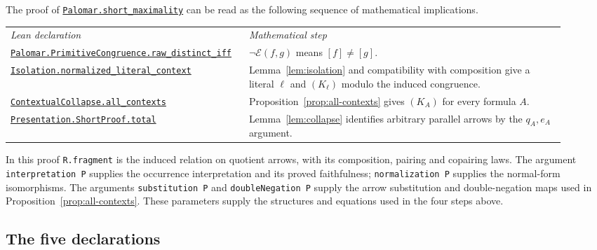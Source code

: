 \documentclass[11pt]{article}
\begin{document}
The proof of \href{https://github.com/flengyel/Dosen-Petric-Maximality/blob/5dbee39bea09539bd130f729e82636419f71f920/DosenPetric/PalomarMaximality.lean\#L27}{\texttt{Palomar.short\_maximality}} can be read as
the following sequence of mathematical implications.
\begin{center}
\small
\begin{tabular}{>{\raggedright\arraybackslash}p{0.37\linewidth}>{\raggedright\arraybackslash}p{0.55\linewidth}}
\textit{Lean declaration} & \textit{Mathematical step}\\[3pt]
\href{https://github.com/flengyel/Dosen-Petric-Maximality/blob/5dbee39bea09539bd130f729e82636419f71f920/DosenPetric/PalomarCorrespondence.lean\#L121}{\texttt{Palomar.PrimitiveCongruence.\allowbreak{}raw\_distinct\_iff}}
 & $\neg\mathcal E(f,g)$ means $[f]\ne[g]$.\\[5pt]
\href{https://github.com/flengyel/Dosen-Petric-Maximality/blob/5dbee39bea09539bd130f729e82636419f71f920/DosenPetric/Isolation.lean\#L219}{\texttt{Isolation.\allowbreak{}normalized\_literal\_context}}
 & Lemma~\ref{lem:isolation} and compatibility with composition give a literal $\ell$ and $(K_\ell)$
   modulo the induced congruence.\\[5pt]
\href{https://github.com/flengyel/Dosen-Petric-Maximality/blob/5dbee39bea09539bd130f729e82636419f71f920/DosenPetric/Substitution.lean\#L90}{\texttt{ContextualCollapse.\allowbreak{}all\_contexts}}
 & Proposition~\ref{prop:all-contexts} gives $(K_A)$ for every formula $A$.\\[5pt]
\href{https://github.com/flengyel/Dosen-Petric-Maximality/blob/5dbee39bea09539bd130f729e82636419f71f920/DosenPetric/PresentationShortProjection.lean\#L86}{\texttt{Presentation.ShortProof.\allowbreak{}total}}
 & Lemma~\ref{lem:collapse} identifies arbitrary parallel arrows by
   the $q_A,e_A$ argument.
\end{tabular}
\end{center}
In this proof \texttt{R.fragment} is the induced relation on
quotient arrows, with its composition, pairing and copairing
laws. The argument \texttt{interpretation P} supplies the
occurrence interpretation and its proved faithfulness;
\texttt{normalization P} supplies the normal-form isomorphisms.
The arguments \texttt{substitution P} and
\texttt{doubleNegation P} supply the arrow substitution and
double-negation maps used in Proposition~\ref{prop:all-contexts}.
These parameters supply the structures and equations used in
the four steps above.

\subsection{The five declarations}
\end{document}
